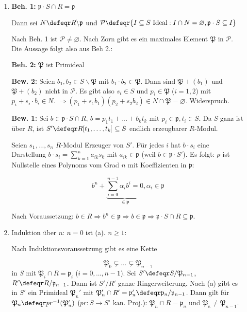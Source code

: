 \begin{Bew}
\begin{enumerate}
\item \textbf{Beh. 1: } $\mathfrak{p}\cdot S \cap R =\mathfrak{p}$

Dann sei $N\defeqr R\backslash\mathfrak{p}$ und $\mathcal{P}\defeqr
\{I\subseteq S\ \text{Ideal}: I\cap N=\varnothing, \mathfrak{p}\cdot S \subseteq I\}$

Nach Beh. 1 ist $\mathcal{P}\neq \varnothing$. Nach Zorn gibt es ein maximales Element
$\mathfrak{P}$ in $\mathcal{P}$. Die Aussage folgt also aus Beh 2.:

\textbf{Beh. 2: } $\mathfrak{P}$ ist Primideal

\textbf{Bew. 2: } Seien $b_1, b_2\in S\backslash \mathfrak{P}$ mit $b_1\cdot b_2\in \mathfrak{P}$.
Dann sind $\mathfrak{P}+(b_1)$ und $\mathfrak{P}+(b_2)$ nicht in $\mathcal{P}$. Es gibt
also $s_i\in S$ und $p_i\in \mathfrak{P}$ ($i=1,2$) mit $p_i+s_i\cdot b_i\in N$.
$\Rightarrow (p_1+s_1b_1)(p_2+s_2b_2)\in N\cap \mathfrak{P}=\varnothing$. Widerspruch.

\textbf{Bew. 1: } Sei $b\in \mathfrak{p}\cdot S\cap R$, $b=p_1t_1+\ldots+b_k t_k$ mit 
$p_i\in \mathfrak{p}, t_i\in S$. Da $S$ ganz ist \"uber $R$, ist 
$S'\defeqr R[t_1, \ldots, t_k]\subseteq S$ endlich erzeugbarer $R$-Modul.

Seien $s_1,\ldots, s_n$ $R$-Modul Erzeuger von $S'$. F\"ur jedes $i$ hat $b\cdot s_i$ eine
Darstellung $b\cdot s_i=\sum_{k=1}^{n}a_{ik}s_k$ mit $a_{ik}\in \mathfrak{p}$
(weil $b\in \mathfrak{p}\cdot S'$). Es folgt: $p$ ist Nullstelle eines Polynoms
vom Grad $n$ mit Koeffizienten in $\mathfrak{p}$: 

$$b^n+ \underbrace{\sum_{i=0}^{n-1}\alpha_i b^i=0}_{\in \mathfrak{p}}, \alpha_i\in \mathfrak{p}$$

Nach Voraussetzung: $b\in R\Rightarrow b^n\in \mathfrak{p}\Rightarrow b\in \mathfrak{p}
\Rightarrow \mathfrak{p}\cdot S \cap R\subseteq \mathfrak{p}$.

\item Induktion \"uber $n$: $n=0$ ist (a). $n\geq 1$:

Nach Induktionsvoraussetzung gibt es eine Kette

$$\mathfrak{P}_0\subsetneq\ldots\subsetneq\mathfrak{P}_{n-1}$$ 
in $S$ mit $\mathfrak{P}_i\cap R=\mathfrak{p}_i$ ($i=0,\ldots, n-1$). Sei
$S'\defeqr S/\mathfrak{P}_{n-1}$, $R'\defeqr R/\mathfrak{p}_{n-1}$. Dann 
ist $S'/R'$ ganze Ringerweiterung. Nach (a) gibt es in $S'$ ein Primideal $\mathfrak{P}_{n}'$
mit $\mathfrak{P}_n'\cap R'=\mathfrak{p}_n'\defeqr \mathfrak{p}_n/\mathfrak{p}_{n-1}$.
Dann gilt f\"ur $\mathfrak{P}_n\defeqr pr^{-1}(\mathfrak{P}_n')$ ($pr:S\to S'$ kan. Proj.):
$\mathfrak{P}_n\cap R=\mathfrak{p}_n$ und $\mathfrak{P_n}\neq\mathfrak{P}_{n-1}$.


\end{enumerate}
\end{Bew}
